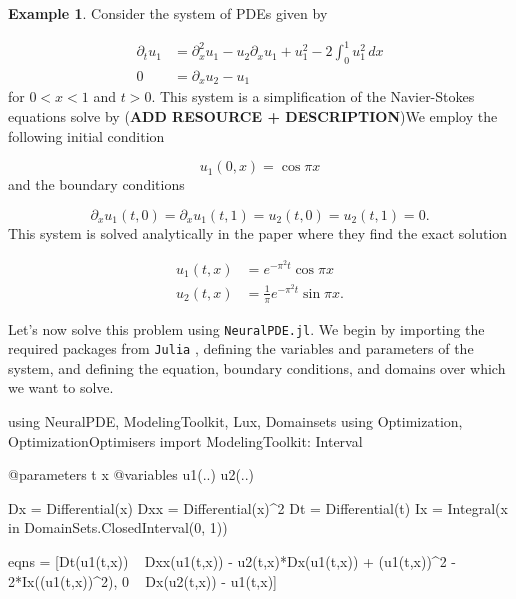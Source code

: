 \documentclass{CUP-JNL-DTM}%
\theoremstyle{definition}
\newtheorem{example}[theorem]{Example}
\numberwithin{equation}{section}
\newcommand{\Julia}{\texttt{Julia} }
\begin{document}
\begin{example}

Consider the system of PDEs given by 

\begin{equation}
    \begin{split}
        \partial_t u_1 & = \partial_x^2 u_1 - u_2 \partial_x u_1 + u_1^2 - 2\int_0^1 u_1^2 \,dx \\
        0 & = \partial_x u_2 - u_1
    \end{split}
\end{equation}
for $0 < x < 1$ and $t > 0$. This system is a simplification of the Navier-Stokes equations solve by (\textbf{ADD RESOURCE + DESCRIPTION})We employ the following initial condition

\begin{equation}
    u_1(0,x) = \cos \pi x
\end{equation}
and the boundary conditions

\begin{equation}
    \partial_x u_1(t,0) = \partial_x u_1(t,1) = u_2(t,0) = u_2(t,1) = 0. 
\end{equation}
This system is solved analytically in the paper \cite{benhammoudaAnalyticalSolutionsSystems2014} where they find the exact solution

\begin{equation}
    \begin{split}
        u_1(t,x) & = e^{-\pi^2t}\cos \pi x \\
        u_2(t,x) & = \frac{1}{\pi}e^{-\pi^2t} \sin \pi x. 
    \end{split}
\end{equation}

Let's now solve this problem using \texttt{NeuralPDE.jl}. We begin by importing the required packages from \Julia, defining the variables and parameters of the system, and defining the equation, boundary conditions, and domains over which we want to solve. 

\begin{jllisting}
using NeuralPDE, ModelingToolkit, Lux, Domainsets
using Optimization, OptimizationOptimisers
import ModelingToolkit: Interval

@parameters t x
@variables u1(..) u2(..)

Dx = Differential(x)
Dxx = Differential(x)^2
Dt = Differential(t)
Ix = Integral(x in DomainSets.ClosedInterval(0, 1))

eqns = [Dt(u1(t,x)) ~ Dxx(u1(t,x)) - u2(t,x)*Dx(u1(t,x)) + 
                                        (u1(t,x))^2 - 2*Ix((u1(t,x))^2),
        0 ~ Dx(u2(t,x)) - u1(t,x)]


\end{jllisting}
\end{example}
\end{document}

